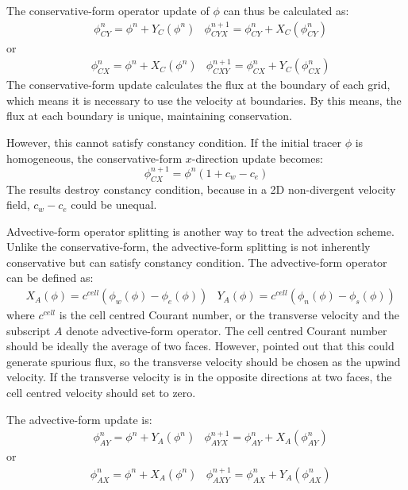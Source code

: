 The conservative-form operator update of $\phi$ can thus be calculated as:
\begin{eqnarray} \label{eq:2.14}
&\phi^n_{\scriptscriptstyle CY} = \phi^n +Y_{\scriptscriptstyle C}(\phi^n)
&\phi^{n+1}_{\scriptscriptstyle CYX} = \phi^n_{\scriptscriptstyle CY} +X_{\scriptscriptstyle C}(\phi^n_{\scriptscriptstyle CY})
\end{eqnarray}
or
\begin{eqnarray*} 
&\phi^n_{\scriptscriptstyle CX} = \phi^n +X_{\scriptscriptstyle C}(\phi^n) 
&\phi^{n+1}_{\scriptscriptstyle CXY} = \phi^n_{\scriptscriptstyle CX} +Y_{\scriptscriptstyle C}(\phi^n_{\scriptscriptstyle CX})
\end{eqnarray*}
The conservative-form update calculates the flux at the boundary of each grid, which means it is necessary to use the velocity at boundaries.  By this means, the flux at each boundary is unique, maintaining conservation. 

However, this cannot satisfy constancy condition. If the initial tracer $\phi $ is homogeneous, the conservative-form $x$-direction update becomes:
\begin{equation} \label{eq:2.15}
\phi^{n+1}_{\scriptscriptstyle CX} = \phi^n(1 +c_{w}-c_e)
\end{equation}
The results destroy constancy condition, because in a 2D non-divergent velocity field, $c_{w}-c_e$ could be unequal. 

Advective-form operator splitting is another way to treat the advection scheme. Unlike the conservative-form, the advective-form splitting is not inherently conservative but can satisfy constancy condition. The advective-form operator can be defined as:
\begin{eqnarray} \label{eq:2.16}
&X_{\scriptscriptstyle A}(\phi ) = c^{cell}(\phi_w(\phi )-\phi_e(\phi )) 
&Y_{\scriptscriptstyle A}(\phi ) = c^{cell}(\phi_n(\phi )-\phi_s(\phi ))
\end{eqnarray}
where $c^{cell}$ is the cell centred Courant number, or the transverse velocity and the subscript $A$ denote advective-form operator. The cell centred Courant number should be ideally the average of two faces. However, \citep{Lin1996} pointed out that this could generate spurious flux, so the transverse velocity should be chosen as the upwind velocity. If the transverse velocity is in the opposite directions at two faces, the cell centred velocity should set to zero.

The advective-form update is:
\begin{eqnarray} \label{eq:2.17}
&\phi^{n}_{\scriptscriptstyle AY} = \phi^{n} +Y_{\scriptscriptstyle A}(\phi^{n}) 
&\phi^{n+1}_{\scriptscriptstyle AYX} = \phi^{n}_{\scriptscriptstyle AY} +X_{\scriptscriptstyle A}(\phi^{n}_{\scriptscriptstyle AY})
\end{eqnarray}
or
\begin{eqnarray*}
&\phi^{n}_{\scriptscriptstyle AX} = \phi^{n} +X_{\scriptscriptstyle A}(\phi^{n}) 
&\phi^{n+1}_{\scriptscriptstyle AXY} = \phi^{n}_{\scriptscriptstyle AX} +Y_{\scriptscriptstyle A}(\phi^{n}_{\scriptscriptstyle AX})
\end{eqnarray*}

